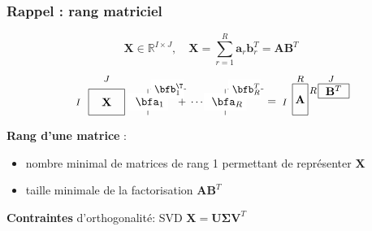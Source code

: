 \documentclass[9pt]{beamer}
\begin{document}
\begin{frame}
\frametitle{Rappel : rang matriciel}
\[
\mathbf{X} \in \mathbb{R}^{I \times J}, \quad \mathbf{X} = \sum_{r=1}^R  \mathbf{a}_{r} \mathbf{b}_{r}^T = \mathbf{A} \mathbf{B}^T
\]
\[
\raisebox{-0.35\height}{\begin{tikzpicture}[scale=0.8]
\draw(0,0.5) node (A) {$\mathbf{X}$};
\draw(-1.1,0.5) node (eq) {\footnotesize ${I}$};
\draw(0,1.4) node (eq) {\footnotesize ${J}$};
\draw(-0.7,0) rectangle (0.7,1);
\draw(1.1,0.5) node (eq) {${=}$};
\draw(1.6,0) -- (1.6,1);
\draw(1.6,0.5) node[fill=white] (a1) {{ $\bfa_1$}};
\draw(1.7,1) -- (3.08,1);
\draw(2.35,1) node[fill=white] (b1) {{\small $\bfb_1^{\T}\!\!$}};
\draw(3.5,0.5) node () {{\small $+\; \cdots\;+$}};
\draw(4.6,0) -- (4.6,1);
\draw(4.6,0.5) node[fill=white] (a1) {{ $\bfa_R$}};
\draw(4.7,1) -- (6.08,1);
\draw(5.35,1) node[fill=white] (b1) {{\small $\bfb_R^{T}\!\!$}};
\end{tikzpicture}}
\raisebox{-0.35\height}{\begin{tikzpicture}[scale=0.8]
\draw(1.2,0.5) node (eq) {$=$};

\draw(1.7,0.5) node (eq) {\footnotesize ${I}$};

\draw(2,0) rectangle (2.6,1.2); %
\draw(2.3,0.6) node (A) {$\mathbf{A}$};

\draw(2.3,1.4) node (eq) {\footnotesize ${R}$};
\draw(3.5,1.4) node (eq) {\footnotesize ${J}$};

\draw(3,0.65) rectangle (4.2,1.2); %
\draw(2.8,0.95) node (eq) {\footnotesize ${R}$};
\draw(3.6,0.95) node (A) {$\mathbf{B}^{T}$};
\end{tikzpicture}}
\]

\textbf{Rang d'une matrice} : 
\begin{itemize}
\item[1.] nombre minimal de matrices de rang 1 permettant de représenter $\mathbf{X}$
\item[2.] taille minimale de la factorisation $\mathbf{A} \mathbf{B}^T $
\end{itemize}

 \textbf{Contraintes} d'orthogonalité: SVD \quad $\mathbf{X} = \mathbf{U} \mathbf{\Sigma}\mathbf{V}^{T}$
\\[2ex]



\end{frame}
\end{document}
